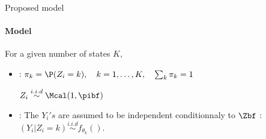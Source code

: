 \begin{frame}[fragile]{Proposed model}
\paragraph{Model}
For a given number of states $K$, 
\begin{itemize}
\item
 : $\pi_k=\P(Z_i=k), \quad k=1,\ldots, K, \quad \sum_k \pi_k=1$\par
 $Z_i \overset{i.i.d}{\sim} \Mcal(1, \pibf)$
 \item {}: The $Y_i's$ are assumed to be independent  conditionnaly to $\Zbf$ : $(Y_i\vert Z_i = k) \overset{i.i.d}{\sim} f_{\theta_k}().$
\end{itemize}
\begin{columns}
  \begin{column}{0.45\textwidth}
\begin{knitrout}
\color{fgcolor}\begin{kframe}
\begin{alltt}
 \hlkwb{<-}  \hlkwb{<-}  \hlkwb{<-} \hlstd{(}\hlstd{,}  \hlkwb{<-} \hlstd{(}\hlstd{,}\hlstd{)}
 \hlkwb{<-} \hlstd{(}\hlopt{:}\hlstd{,}    \hlstd{=}\hlstd{(}\hlstd{,} \hlstd{))}
 \hlopt{+}\hlstd{,} \hlstd{=}\hlstd{)}
 \hlkwb{<-}   
 \hlopt{+}\hlstd{,} \hlstd{=}\hlstd{)}
\end{alltt}
\end{kframe}
\end{knitrout}
 \end{column}
  \begin{column}{0.45\textwidth}
  \end{column}
  \end{columns}
\end{frame}

